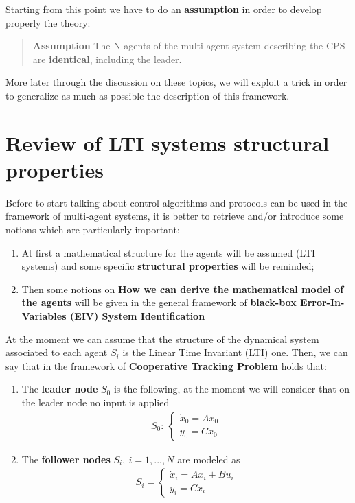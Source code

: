 Starting from this point we have to do an \textbf{assumption} in order to develop properly the theory:
\begin{quotation}
    \color{red}
    \textbf{Assumption} The N agents of the multi-agent system describing the CPS are \textbf{identical}, including the leader.
\end{quotation}
More later through the discussion on these topics, we will exploit a trick in order to generalize as much as possible the description of this framework.

\section{Review of LTI systems structural properties}
\noindent
Before to start talking about control algorithms and protocols can be used in the framework of multi-agent systems, it is better to retrieve and/or introduce some notions which are particularly important:
\begin{enumerate}
    \item At first a mathematical structure for the agents will be assumed (LTI systems) and some specific \textbf{structural properties} will be reminded;
    \item Then some notions on \textbf{How we can derive the mathematical model of the agents} will be given in the general framework of \textbf{black-box Error-In-Variables (EIV) System Identification}
\end{enumerate}

At the moment we can assume that the structure of the dynamical system associated to each agent $S_i$ is the Linear Time Invariant (LTI) one. Then, we can say that in the framework of \textbf{Cooperative Tracking Problem} holds that:
\begin{enumerate}
    \item The \textbf{leader node} $S_0$ is the following, at the moment we will consider that on the leader node no input is applied 
    \begin{equation}
        \begin{aligned}
            S_0: \ \begin{cases}
                \dot{x}_0=Ax_0\\
                y_0=Cx_0
            \end{cases}
        \end{aligned}
    \end{equation}
    \item The \textbf{follower nodes} $S_i, \ i=1,..., N$ are modeled as 
    \begin{equation}
        \begin{aligned}
            S_i=\begin{cases}
                \dot{x}_i=Ax_i+Bu_i\\
                y_i=Cx_i
            \end{cases}
        \end{aligned}
    \end{equation}
\end{enumerate}

